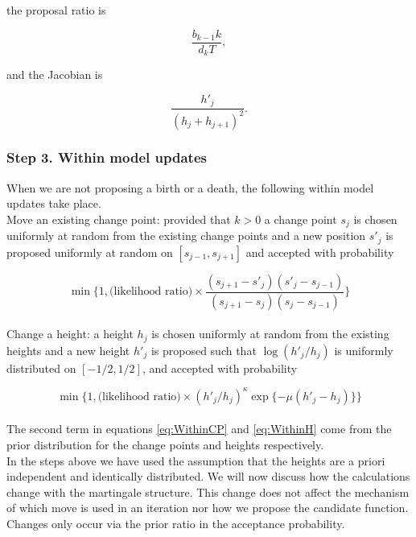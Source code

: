 \documentclass[../main.tex]{subfiles}
\begin{document}
the proposal ratio is


\begin{equation}
 \frac{b_{k-1} k}{d_{k}T},
\end{equation} 

and the Jacobian is

\begin{equation}
\frac{h'_j}{(h_j + h_{j+1})^2} .
\end{equation} 

    \subsubsection{Step 3. Within model updates}
When we are not proposing a birth or a death, the following within model updates take place.\\

Move an existing change point: provided that $k>0$ a change point $s_j$ is chosen uniformly at random from the existing change points and a new position $s'_j$ is proposed uniformly at random on $[s_{j-1}, s_{j+1}]$ and accepted with probability

 \begin{equation} \label{eq:WithinCP}
\min \bigg\{1, \text{(likelihood ratio)} \times \frac{(s_{j+1} - s'_j)(s'_j - s_{j-1})}{(s_{j+1} - s_j)(s_j - s_{j-1})} \bigg\}
\end{equation}  \\

Change a height: a height $h_j$ is chosen uniformly at random from the existing heights and a new height $h'_j$ is proposed such that $\log(h'_j/h_j)$ is uniformly distributed on $[-1/2,1/2]$, and accepted with probability

 \begin{equation}\label{eq:WithinH}
\min \big\{1, \text{(likelihood ratio)} \times (h'_j/h_j)^\kappa \exp \{ -\mu(h'_j - h_j) \} \big\}
\end{equation}  \\

The second term in equations \eqref{eq:WithinCP} and \eqref{eq:WithinH} come from the prior distribution for the change points and heights respectively. \\

In the steps above we have used the assumption that the heights are a priori independent and identically distributed. We will now discuss how the calculations change with the martingale structure. This change  does not affect the mechanism of which move is used in an iteration nor how we propose the candidate function. Changes only occur via the prior ratio in the acceptance probability. 
\end{document}
